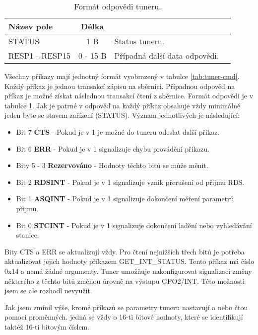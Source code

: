 \begin{table}[ht!]
\begin{center}
\begin{tabular}{|l|c|l|l|}
\hline 
Název pole & Délka &  \\ 
\hline
STATUS & 1 B & Status tuneru.\\
\hline
RESP1 - RESP15 & 0 - 15 B & Případná další data odpovědi.\\
\hline
\end{tabular} 
\end{center}
\caption{Formát odpovědi tuneru.}
\label{tab:tuner-rpl} 
\end{table}

Všechny příkazy mají jednotný formát vyobrazený v tabulce \ref{tab:tuner-cmd}. Každý příkaz je jednou transakcí zápisu na \iic sběrnici. Případnou odpověď na příkaz je možné získat následnou transakcí čtení z \iic sběrnice. Formát odpovědi je v tabulce \ref{tab:tuner-rpl}. Jak je patrné v odpověď na každý příkaz obsahuje vždy minimálně jeden byte se stavem zařízení (STATUS). Význam jednotlivých je následující:

\begin{itemize}
\item Bit 7 \textbf{CTS} - Pokud je v 1 je možné do tuneru odeslat další příkaz.
\item Bit 6 \textbf{ERR} - Pokud je v 1 signalizuje chybu provádění příkazu.
\item Bity 5 - 3 \textbf{Rezervováno} - Hodnoty těchto bitů se může měnit.
\item Bit 2 \textbf{RDSINT} - Pokud je v 1 signalizuje vznik přerušení od přijmu RDS.
\item Bit 1 \textbf{ASQINT} - Pokud je v 1 signalizuje dokončení měření parametrů přijmu.
\item Bit 0 \textbf{STCINT} - Pokud je v 1 signalizuje dokončení ladění nebo vyhledávání stanice.
\end{itemize}  

Bity CTS a ERR se aktualizují vždy. Pro čtení nejnižších třech bitů je potřeba aktualizovat jejich hodnoty příkazem GET\_INT\_STATUS. Tento příkaz má číslo 0x14 a nemá žádné argumenty. Tuner umožňuje nakonfigurovat signalizaci změny některého z těchto bitů změnou úrovně na výstupu GPO2/INT. Této možnosti jsem se ale rozhodl nevyužít.

Jak jsem zmínil výše, kromě příkazů se parametry tuneru nastavují a nebo čtou pomocí proměnných. jedná se vždy o 16-ti bitové hodnoty, které se identifikují taktéž 16-ti bitovým číslem. 

